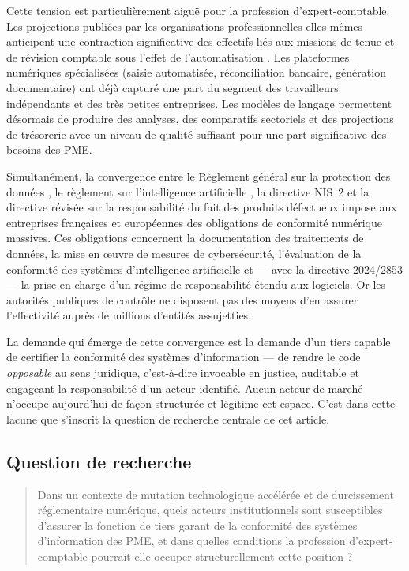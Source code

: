\documentclass[12pt,a4paper]{article}
\begin{document}
Cette tension est particulièrement aiguë pour la profession d'expert-comptable. Les projections publiées par les organisations professionnelles elles-mêmes anticipent une contraction significative des effectifs liés aux missions de tenue et de révision comptable sous l'effet de l'automatisation \parencite{brynjolfsson2014, frey2013}. Les plateformes numériques spécialisées (saisie automatisée, réconciliation bancaire, génération documentaire) ont déjà capturé une part du segment des travailleurs indépendants et des très petites entreprises. Les modèles de langage permettent désormais de produire des analyses, des comparatifs sectoriels et des projections de trésorerie avec un niveau de qualité suffisant pour une part significative des besoins des PME.

Simultanément, la convergence entre le Règlement général sur la protection des données \parencite{rgpd2016}, le règlement sur l'intelligence artificielle \parencite{aiact2024}, la directive NIS~2 \parencite{nis22022} et la directive révisée sur la responsabilité du fait des produits défectueux \parencite{directive20242853} impose aux entreprises françaises et européennes des obligations de conformité numérique massives. Ces obligations concernent la documentation des traitements de données, la mise en œuvre de mesures de cybersécurité, l'évaluation de la conformité des systèmes d'intelligence artificielle et — avec la directive 2024/2853 — la prise en charge d'un régime de responsabilité étendu aux logiciels. Or les autorités publiques de contrôle ne disposent pas des moyens d'en assurer l'effectivité auprès de millions d'entités assujetties.

La demande qui émerge de cette convergence est la demande d'un tiers capable de certifier la conformité des systèmes d'information — de rendre le code \emph{opposable} au sens juridique, c'est-à-dire invocable en justice, auditable et engageant la responsabilité d'un acteur identifié. Aucun acteur de marché n'occupe aujourd'hui de façon structurée et légitime cet espace. C'est dans cette lacune que s'inscrit la question de recherche centrale de cet article.

\subsection*{Question de recherche}

\begin{quote}
Dans un contexte de mutation technologique accélérée et de durcissement réglementaire numérique, quels acteurs institutionnels sont susceptibles d'assurer la fonction de tiers garant de la conformité des systèmes d'information des PME, et dans quelles conditions la profession d'expert-comptable pourrait-elle occuper structurellement cette position ?
\end{quote}
\end{document}
